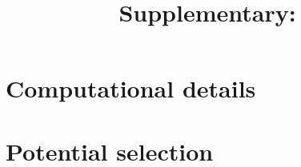 

\title{Supplementary: \titletext}



    \maketitle

    \section{Computational details}
        \label{sec:computational}
        

    \section{Potential selection}
        \label{sec:zerok}
        

    
    

